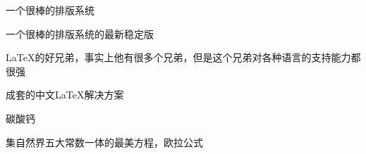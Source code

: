 
\begin{denotation}
	
\item[\LaTeX] 一个很棒的排版系统
\item[\LaTeXe] 一个很棒的排版系统的最新稳定版
\item[\XeTeX] \LaTeX{}的好兄弟，事实上他有很多个兄弟，但是这个兄弟对各种语言的支持能力都很强
\item[ctex] 成套的中文\LaTeX{}解决方案
\item[\ce{CaCO3}] 碳酸钙
\item[$ e^{\pi{}i}+1=0$] 集自然界五大常数一体的最美方程，欧拉公式

\end{denotation}
